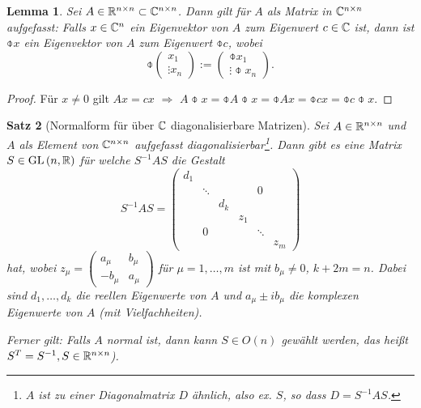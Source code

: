 \documentclass[
 a4paper,
 12pt,
 parskip=half
 ]{scrartcl}
\theoremstyle{plain}
\newtheorem{thm}{Satz}[section] %
\newtheorem{lem}[thm]{Lemma}
\theoremstyle{definition}
\numberwithin{equation}{section}
\begin{document}
\begin{lem}
 Sei $A \in \mathbb{R}^{n \times n} \subset \mathbb{C}^{n \times n}$. Dann gilt für $A$ als Matrix in $\mathbb{C}^{n \times n}$ aufgefasst: Falls $x \in \mathbb{C}^n$ ein Eigenvektor von $A$ zum Eigenwert $c \in \mathbb{C}$ ist, dann ist $\obar{x}$ ein Eigenvektor von $A$ zum Eigenwert $\obar{c}$, wobei
 \[ \obar{\begin{pmatrix} x_1 \\ \vdots x_n \end{pmatrix}} := \begin{pmatrix} \obar{x}_1 \\ \vdots \obar{x}_n \end{pmatrix}. \]
\end{lem}

\begin{proof}
 Für $x \ne 0$ gilt $Ax = cx $ $\Rightarrow$  $A\obar{x} = \obar{A}\obar{x} = \obar{Ax} = \obar{cx} = \obar{c} \obar{x}$.
\end{proof}

\begin{thm}[Normalform für über $\mathbb{C}$ diagonalisierbare Matrizen]
 Sei $A \in \mathbb{R}^{n \times n}$ und $A$ als Element von $\mathbb{C}^{n \times n}$ aufgefasst diagonalisierbar\footnote{$A$ ist zu einer Diagonalmatrix $D$ ähnlich, also ex. $S$, so dass $D=S^{-1} A S$.}. Dann gibt es eine Matrix $S \in \mathrm{GL}\,(n, \mathbb{R})$ für welche $S^{-1} A S$ die Gestalt
 \[ S^{-1} A S = \begin{pmatrix}
     d_1 &        &     &     &        &      \\
         & \ddots &     &     & 0      &      \\
         &        & d_k &     &        &      \\
         &        &     & \boxed{z_1} &        &      \\
         & 0      &     &     & \ddots &      \\
         &        &     &     &        & \boxed{z_m}
    \end{pmatrix} \]
 hat, wobei $z_\mu = \begin{pmatrix} a_\mu & b_\mu \\ -b_\mu & a_\mu \end{pmatrix}$ für $\mu = 1, \ldots, m$ ist mit $b_\mu \ne 0$, $k+2m = n$. Dabei sind $d_1, \ldots, d_k$ die reellen Eigenwerte von $A$ und $a_\mu \pm i b_\mu$ die komplexen Eigenwerte von $A$ (mit Vielfachheiten).
 
 Ferner gilt: Falls $A$ normal ist, dann kann $S \in O(n)$ gewählt werden, das heißt $S^T = S^{-1}, S \in \mathbb{R}^{n \times n}$).
\end{thm}
\end{document}
